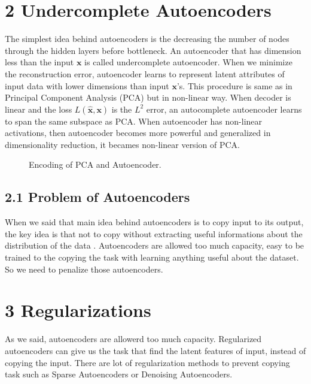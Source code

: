 \documentclass[11pt,twocolumn]{article}
\begin{document}
\section{2 Undercomplete Autoencoders}	
\hspace*{0.5cm} The simplest idea behind autoencoders is the decreasing the number of nodes through the hidden layers before bottleneck. An autoencoder that has dimension less than the input $\mathbf{x}$ is called undercomplete autoencoder. When we minimize the reconstruction error, autoencoder learns to represent latent attributes of input data with lower dimensions than input $\mathbf{x}$'s. This procedure is same as in Principal Component Analysis (PCA) but in non-linear way. When decoder is linear and the loss $L(\mathbf{\hat{x},\mathbf{x}})$ is the $L^2$ error, an autocomplete autoencoder learns to span the same subspace as PCA. When autoencoder has non-linear activations, then autoencoder becomes more powerful and generalized in dimensionality reduction, it becames non-linear version of PCA.
\begin{figure}[H]
\centering
{}
\caption{Encoding of PCA and Autoencoder.}
\end{figure}
\subsection{2.1 Problem of Autoencoders}
When we said that main idea behind autoencoders is to copy input to its output, the key idea is that not to copy without extracting useful informations about the distribution of the data \cite{Goodfellow-et-al-2016}. Autoencoders are allowed too much capacity, easy to be trained to the copying the task with learning anything useful about the dataset. So we need to penalize those autoencoders.

\section{3 Regularizations}
As we said, autoencoders are allowerd too much capacity. Regularized autoencoders can give us the task that find the latent features of input, instead of copying the input. There are lot of regularization methods to prevent copying task such as Sparse Autoencoders or Denoising Autoencoders. 
\end{document}
